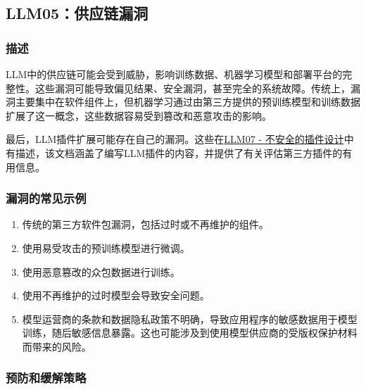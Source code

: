 \documentclass[
]{article}
\author{}
\date{}
\providecommand{\tightlist}{%
  \setlength{\itemsep}{0pt}\setlength{\parskip}{0pt}}
\begin{document}
\subsection{LLM05：供应链漏洞}\label{llm05ux4f9bux5e94ux94feux6f0fux6d1e}

\subsubsection{描述}\label{ux63cfux8ff0}

LLM中的供应链可能会受到威胁，影响训练数据、机器学习模型和部署平台的完整性。这些漏洞可能导致偏见结果、安全漏洞，甚至完全的系统故障。传统上，漏洞主要集中在软件组件上，但机器学习通过由第三方提供的预训练模型和训练数据扩展了这一概念，这些数据容易受到篡改和恶意攻击的影响。

最后，LLM插件扩展可能存在自己的漏洞。这些在\href{InsecurePluginDesign.md}{LLM07
-
不安全的插件设计}中有描述，该文档涵盖了编写LLM插件的内容，并提供了有关评估第三方插件的有用信息。

\subsubsection{漏洞的常见示例}\label{ux6f0fux6d1eux7684ux5e38ux89c1ux793aux4f8b}

\begin{enumerate}
\def\labelenumi{\arabic{enumi}.}
\tightlist
\item
  传统的第三方软件包漏洞，包括过时或不再维护的组件。
\item
  使用易受攻击的预训练模型进行微调。
\item
  使用恶意篡改的众包数据进行训练。
\item
  使用不再维护的过时模型会导致安全问题。
\item
  模型运营商的条款和数据隐私政策不明确，导致应用程序的敏感数据用于模型训练，随后敏感信息暴露。这也可能涉及到使用模型供应商的受版权保护材料而带来的风险。
\end{enumerate}

\subsubsection{预防和缓解策略}\label{ux9884ux9632ux548cux7f13ux89e3ux7b56ux7565}
\end{document}
